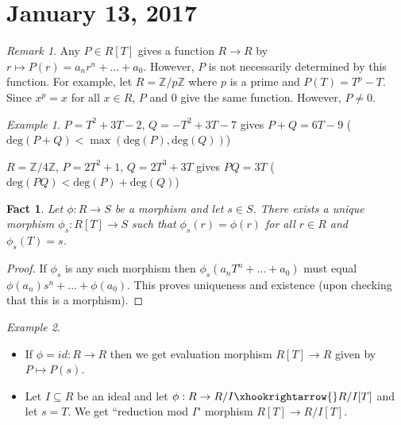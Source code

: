 \documentclass{amsart}
\newcommand{\ZZ}{\mathbb{Z}}
\newtheorem{fact}[thm]{Fact}
\theoremstyle{definition}
\theoremstyle{remark}
\newtheorem*{rmk}{Remark}
\newtheorem*{ex}{Example}
\begin{document}
\section{January 13, 2017} %

\begin{rmk}
Any $P \in R[T]$ gives a function $R \rightarrow R$ by $r \mapsto P(r) = a_nr^n + ... + a_0$.  However, $P$ is not necessarily determined by this function.  For example, let $R = \ZZ / p\ZZ$ where $p$ is a prime and $P(T) = T^p - T$.  Since $x^p = x$ for all $x \in R$, $P$ and $0$ give the same function.  However, $P \neq 0$.
\end{rmk}

\begin{ex}

\item $P = T^2 + 3T - 2$, $Q = -T^2 + 3T - 7$ gives $P+Q = 6T - 9$ ($\text{deg}(P+Q) < \max(\text{deg}(P),\text{deg}(Q))$)

\item $R = \ZZ/4\ZZ$, $P = 2T^2+1$, $Q = 2T^3+3T$ gives $PQ = 3T$ ($\text{deg}(PQ) < \text{deg}(P)+\text{deg}(Q)$)

\end{ex}

\begin{fact}
Let $\phi : R \rightarrow S$ be a morphism and let $s \in S$.  There exists a unique morphism $\phi_s : R[T] \rightarrow S$ such that $\phi_s(r) = \phi(r)$ for all $r \in R$ and $\phi_s(T) = s$.
\end{fact}

\begin{proof}
If $\phi_s$ is any such morphism then $\phi_s(a_nT^n + ... + a_0)$ must equal $\phi(a_n)s^n + ... + \phi(a_0)$.  This proves uniqueness and existence (upon checking that this is a morphism).
\end{proof}

\begin{ex} \hspace{0.5cm}

\begin{itemize}

\item If $\phi = id : R \rightarrow R$ then we get evaluation morphism $R[T] \rightarrow R$ given by $P \mapsto P(s)$.

\item Let $I \subseteq R$ be an ideal and let $\phi : R \rightarrow R/I \xhookrightarrow{} R/I[T]$ and let $s = T$.  We get ``reduction mod $I$" morphism $R[T]\rightarrow R/I[T]$.

\end{itemize}

\end{ex}
\end{document}
